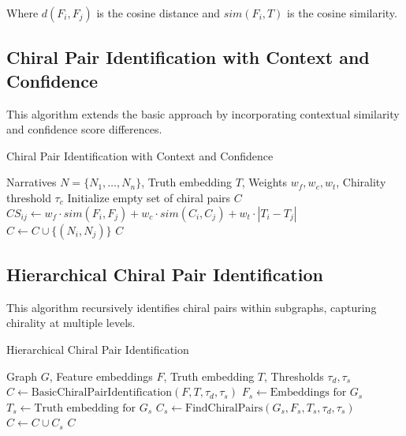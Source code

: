 \documentclass[12pt, a4paper]{article}
\begin{document}
Where \(d(F_i, F_j)\) is the cosine distance and \(sim(F_i, T)\) is the cosine similarity.


\subsection{Chiral Pair Identification with Context and Confidence}

This algorithm extends the basic approach by incorporating contextual similarity and confidence score differences.

\begin{algorithm}[H]
\caption{Chiral Pair Identification with Context and Confidence}
\begin{algorithmic}[1]
\Require Narratives $N = \{N_1, \dots, N_n\}$, Truth embedding $T$, Weights $w_f, w_c, w_t$, Chirality threshold $\tau_c$
\State Initialize empty set of chiral pairs $C$
    \State $CS_{ij} \gets w_f \cdot sim(F_i, F_j) + w_c \cdot sim(C_i, C_j) + w_t \cdot |T_i - T_j|$
     
        \State $C \gets C \cup \{(N_i, N_j)\}$
    \EndIf
\EndFor
\Return $C$
\end{algorithmic}
\end{algorithm}


\subsection{Hierarchical Chiral Pair Identification}

This algorithm recursively identifies chiral pairs within subgraphs, capturing chirality at multiple levels.

\begin{algorithm}[H]
\caption{Hierarchical Chiral Pair Identification}
\begin{algorithmic}[1]
\Require Graph $G$, Feature embeddings $F$, Truth embedding $T$, Thresholds $\tau_d, \tau_s$
    \State $C \gets \text{BasicChiralPairIdentification}(F, T, \tau_d, \tau_s)$
        \State $F_s \gets \text{Embeddings for } G_s$
        \State $T_s \gets \text{Truth embedding for } G_s$ 
        \State $C_s \gets \text{FindChiralPairs}(G_s, F_s, T_s, \tau_d, \tau_s)$
        \State $C \gets C \cup C_s$
    \EndFor
    \Return $C$
\EndFunction
\end{algorithmic}
\end{algorithm}
\end{document}
